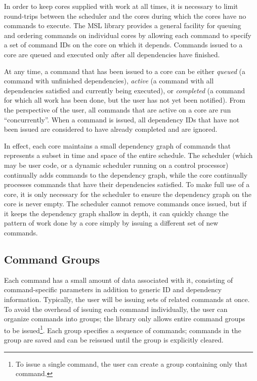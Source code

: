 In order to keep cores supplied with work at all times, it is
necessary to limit round-trips between the scheduler and the cores
during which the cores have no commands to execute. The MSL library
provides a general facility for queuing and ordering commands on
individual cores by allowing each command to specify a set of command
IDs on the core on which it depends. Commands issued to a core are
queued and executed only after all dependencies have finished.

At any time, a command that has been issued to a core can be either
\emph{queued} (a command with unfinished dependencies), \emph{active}
(a command with all dependencies satisfied and currently being
executed), or \emph{completed} (a command for which all work has been
done, but the user has not yet been notified). From the perspective of
the user, all commands that are active on a core are run
``concurrently''. When a command is issued, all dependency IDs that
have not been issued are considered to have already completed and are
ignored.

In effect, each core maintains a small dependency graph of commands
that represents a subset in time and space of the entire
schedule. The scheduler (which may be
user code, or a dynamic scheduler running on a control processor)
continually adds commands to the dependency graph, while the core
continually processes commands that have their dependencies
satisfied. To make full use of a core, it is only necessary for the
scheduler to ensure the dependency graph on the core is never
empty. The scheduler cannot remove commands once issued, but if it
keeps the dependency graph shallow in depth, it can quickly change the
pattern of work done by a core simply by issuing a different set of
new commands.

\subsection{Command Groups}

Each command has a small amount of data associated with it, consisting
of command-specific parameters in addition to generic ID and
dependency information. Typically, the user will be issuing sets of
related commands at once. To avoid the overhead of issuing each
command individually, the user can organize commands into groups; the
library only allows entire command groups to be issued\footnote{To
issue a single command, the user can create a group containing only
that command.}. Each group specifies a sequence of commands; commands
in the group are saved and can be reissued until the group is
explicitly cleared.

